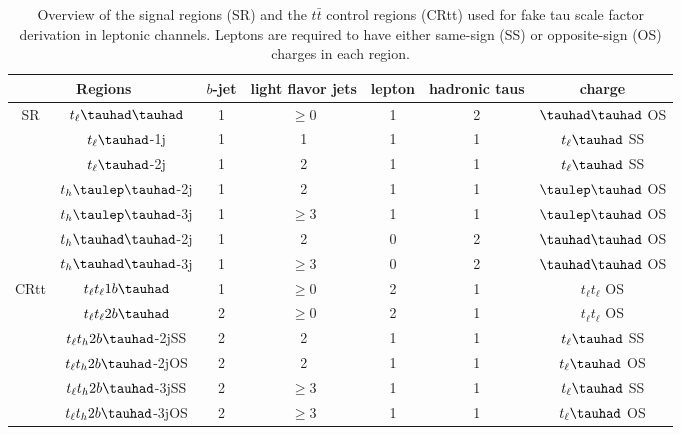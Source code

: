 \documentclass[PAPER, coverpage, atlasdraft=true, texlive=2016, UKenglish]{\ATLASLATEXPATH atlasdoc}
\begin{document}
\begin{table}
\centering
\caption{Overview of the signal regions (SR) and the $t\bar{t}$ control regions (CRtt) used for fake tau scale factor derivation in leptonic channels. Leptons are required to have either same-sign (SS) or opposite-sign (OS) charges in each region.}
\label{tab:srcr}
\begin{tabular}[h]{c|c|c|c|c|c|c}
\hline \hline
\multicolumn{2}{c|}{Regions} & $b$-jet & light flavor jets        & lepton & hadronic taus & charge\\ \hline
\multirow{7}{*}{SR}&$t_{\ell}\thadhad$     & 1     & $\ge0$                                & 1      & 2             & $\thadhad$ OS\\ \cline{2-7}
&$t_{\ell}\tauhad$-1j  & 1     & 1                                   & 1      & 1                     & $t_{\ell}\tauhad$ SS\\ \cline{2-7}
&$t_{\ell}\tauhad$-2j  & 1     & 2                                        & 1      & 1                     & $t_{\ell}\tauhad$ SS\\ \cline{2-7}
&$t_h\tlhad$-2j   & 1     & 2                           & 1      & 1             & $\tlhad$ OS\\ \cline{2-7}
&$t_h\tlhad$-3j   & 1     & $\ge3$                      & 1      & 1             & $\tlhad$ OS\\ \cline{2-7}
&$t_h\thadhad$-2j & 1     & 2                            & 0      & 2             & $\thadhad$ OS\\ \cline{2-7}
&$t_h\thadhad$-3j & 1     & $\ge3$                       & 0      & 2             & $\thadhad$ OS\\ \hline
\multirow{6}{*}{CRtt}&$t_{\ell}t_{\ell}1b\tauhad$ & 1     & $\ge0$                            & 2      & 1                     & $t_{\ell}t_{\ell}$ OS\\ \cline{2-7}
&$t_{\ell}t_{\ell}2b\tauhad$      & 2     & $\ge0$                            & 2      & 1                     & $t_{\ell}t_{\ell}$ OS\\ \cline{2-7}
&$t_{\ell}t_h2b\tauhad$-2jSS & 2     & 2                             & 1      & 1             & $t_{\ell}\tauhad$ SS\\ \cline{2-7}
&$t_{\ell}t_h2b\tauhad$-2jOS & 2     & 2                             & 1      & 1             & $t_{\ell}\tauhad$ OS\\ \cline{2-7}
&$t_{\ell}t_h2b\tauhad$-3jSS & 2     & $\ge3$                        & 1      & 1             & $t_{\ell}\tauhad$ SS\\ \cline{2-7}
&$t_{\ell}t_h2b\tauhad$-3jOS & 2     & $\ge3$                & 1      & 1             & $t_{\ell}\tauhad$ OS\\ \hline
\end{tabular}
\end{table}
\end{document}
